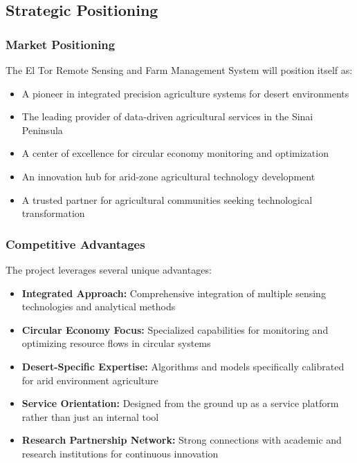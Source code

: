 \subsection{Strategic Positioning}

\subsubsection{Market Positioning}
The El Tor Remote Sensing and Farm Management System will position itself as:

\begin{itemize}
    \item A pioneer in integrated precision agriculture systems for desert environments
    \item The leading provider of data-driven agricultural services in the Sinai Peninsula
    \item A center of excellence for circular economy monitoring and optimization
    \item An innovation hub for arid-zone agricultural technology development
    \item A trusted partner for agricultural communities seeking technological transformation
\end{itemize}

\subsubsection{Competitive Advantages}
The project leverages several unique advantages:

\begin{itemize}
    \item \textbf{Integrated Approach:} Comprehensive integration of multiple sensing technologies and analytical methods
    \item \textbf{Circular Economy Focus:} Specialized capabilities for monitoring and optimizing resource flows in circular systems
    \item \textbf{Desert-Specific Expertise:} Algorithms and models specifically calibrated for arid environment agriculture
    \item \textbf{Service Orientation:} Designed from the ground up as a service platform rather than just an internal tool
    \item \textbf{Research Partnership Network:} Strong connections with academic and research institutions for continuous innovation
\end{itemize}


